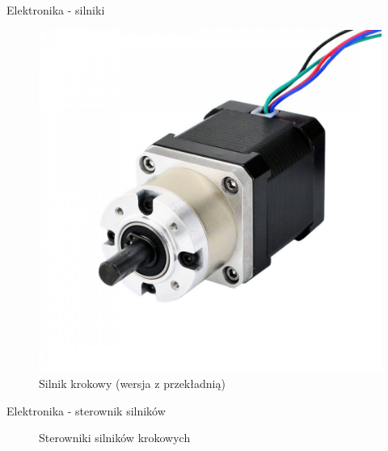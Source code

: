 \documentclass{beamer}
\begin{document}
\begin{frame}{Elektronika - silniki}
	
	\begin{figure}[h]
		\centering
		\includegraphics[height=0.6\textheight]{img/stepper_motor_gear.jpg}
		\caption{Silnik krokowy (wersja z przekładnią)}
		\label{ros:krokowiec}
	\end{figure}
\end{frame}

\begin{frame}{Elektronika - sterownik silników}
	
	\begin{figure}%
		\centering
		\qquad
		\caption{Sterowniki silników krokowych}
		\label{fig:sterownik:porownanie}%
		
	\end{figure}
\end{frame}
\end{document}

